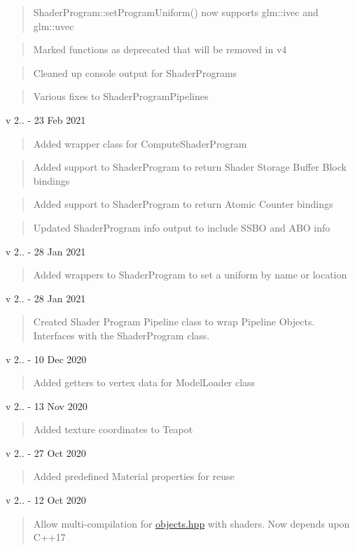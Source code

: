 \begin{quote}
Shader\+Program\+::set\+Program\+Uniform() now supports glm\+::ivec and glm\+::uvec \end{quote}
\begin{quote}
Marked functions as deprecated that will be removed in v4 \end{quote}
\begin{quote}
Cleaned up console output for Shader\+Programs \end{quote}
\begin{quote}
Various fixes to Shader\+Program\+Pipelines \end{quote}
v 2.. -\/ 23 Feb 2021 \begin{quote}
Added wrapper class for Compute\+Shader\+Program \end{quote}
\begin{quote}
Added support to Shader\+Program to return Shader Storage Buffer Block bindings \end{quote}
\begin{quote}
Added support to Shader\+Program to return Atomic Counter bindings \end{quote}
\begin{quote}
Updated Shader\+Program info output to include SSBO and ABO info \end{quote}
v 2.. -\/ 28 Jan 2021 \begin{quote}
Added wrappers to Shader\+Program to set a uniform by name or location \end{quote}
v 2.. -\/ 28 Jan 2021 \begin{quote}
Created Shader Program Pipeline class to wrap Pipeline Objects. Interfaces with the Shader\+Program class. \end{quote}
v 2.. -\/ 10 Dec 2020 \begin{quote}
Added getters to vertex data for Model\+Loader class \end{quote}
v 2.. -\/ 13 Nov 2020 \begin{quote}
Added texture coordinates to Teapot \end{quote}
v 2.. -\/ 27 Oct 2020 \begin{quote}
Added predefined Material properties for reuse \end{quote}
v 2.. -\/ 12 Oct 2020 \begin{quote}
Allow multi-\/compilation for \mbox{\hyperlink{objects_8hpp}{objects.\+hpp}} with shaders. Now depends upon C++17 \end{quote}
